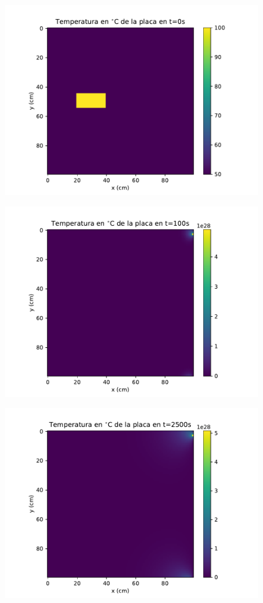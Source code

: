 \documentclass[12pt,letterpaper]{article}
\begin{document}
\begin{figure}[H]
\includegraphics{a2_0.pdf}
\centering
\end{figure}

\begin{figure}[H]
\includegraphics{a2_100.pdf}
\centering
\end{figure}

\begin{figure}[H]
\includegraphics{a2_2500.pdf}
\centering
\end{figure}
\end{document}
